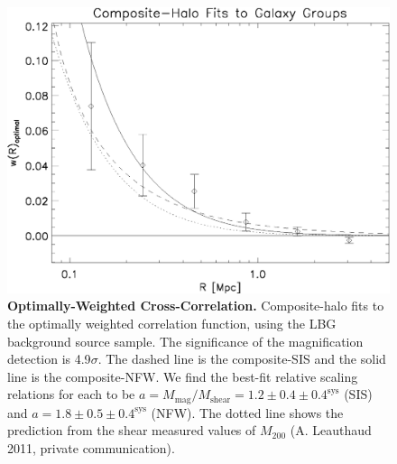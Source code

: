 


\begin{figure}
\begin{center}
\includegraphics[scale=1.0]{plots_ch2/wopt_CompositeHaloFits_44x_LFam1_aveErr07magcut.eps}
\caption[Optimally-Weighted Cross-Correlation]{{\bf Optimally-Weighted Cross-Correlation.} Composite-halo fits to the optimally weighted correlation function, using the \ac{LBG} background source sample. The significance of the magnification detection is 4.9$\sigma$. The dashed line is the composite-\ac{SIS} and the solid line is the composite-\ac{NFW}.  We find the best-fit relative scaling relations for each to be $a= M_{\text{mag}}/M_{\text{shear}}= 1.2 \pm 0.4 \pm 0.4^{\text{sys}}$ (\ac{SIS}) and $a= 1.8 \pm 0.5 \pm 0.4^{\text{sys}}$ (\ac{NFW}). The dotted line shows the prediction from the shear measured values of $M_{200}$ (A. Leauthaud 2011, private communication).}
\label{plot:multihalo2}
\end{center}
\end{figure}


